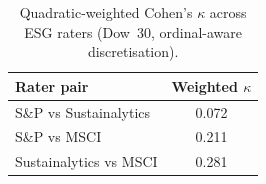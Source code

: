 \begin{table}[t]
  \centering
  \caption{Quadratic-weighted Cohen's $\kappa$ across ESG raters (Dow~30, ordinal-aware discretisation).}
  \label{tab:kappa}
  \begin{tabular}{@{}lS[table-format=1.3]@{}}
    \toprule
    Rater pair & {Weighted $\kappa$} \\
    \midrule
    S\&P vs Sustainalytics & 0.072 \\
    S\&P vs MSCI & 0.211 \\
    Sustainalytics vs MSCI & 0.281 \\
    \bottomrule
  \end{tabular}
\end{table}
